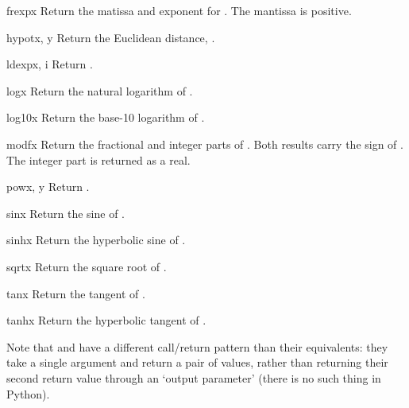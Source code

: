 \begin{funcdesc}{frexp}{x}
Return the matissa and exponent for .  The mantissa is
positive.
\end{funcdesc}

\begin{funcdesc}{hypot}{x, y}
Return the Euclidean distance, .
\end{funcdesc}

\begin{funcdesc}{ldexp}{x, i}
Return .
\end{funcdesc}

\begin{funcdesc}{log}{x}
Return the natural logarithm of .
\end{funcdesc}

\begin{funcdesc}{log10}{x}
Return the base-10 logarithm of .
\end{funcdesc}

\begin{funcdesc}{modf}{x}
Return the fractional and integer parts of .  Both results
carry the sign of .  The integer part is returned as a real.
\end{funcdesc}

\begin{funcdesc}{pow}{x, y}
Return .
\end{funcdesc}

\begin{funcdesc}{sin}{x}
Return the sine of .
\end{funcdesc}

\begin{funcdesc}{sinh}{x}
Return the hyperbolic sine of .
\end{funcdesc}

\begin{funcdesc}{sqrt}{x}
Return the square root of .
\end{funcdesc}

\begin{funcdesc}{tan}{x}
Return the tangent of .
\end{funcdesc}

\begin{funcdesc}{tanh}{x}
Return the hyperbolic tangent of .
\end{funcdesc}

Note that  and  have a different
call/return pattern than their \C{} equivalents: they take a single
argument and return a pair of values, rather than returning their
second return value through an `output parameter' (there is no such
thing in Python).

